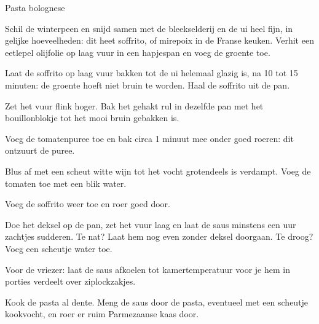 \begin{recipe}{Pasta bolognese}
\begin{steps}
  \item Schil de winterpeen en snijd samen met de bleekselderij en de ui
        heel fijn, in gelijke hoeveelheden: dit heet soffrito, of mirepoix
        in de Franse keuken. Verhit een eetlepel olijfolie op laag vuur in
        een hapjespan en voeg de groente toe.
  \item Laat de soffrito op laag vuur bakken tot de ui helemaal glazig is,
        na 10 tot 15 minuten: de groente hoeft niet bruin te worden. Haal de
        soffrito uit de pan.
  \item Zet het vuur flink hoger. Bak het gehakt rul in dezelfde pan met het
        bouillonblokje tot het mooi bruin gebakken is.
  \item Voeg de tomatenpuree toe en bak circa 1 minuut mee onder goed
        roeren: dit ontzuurt de puree.
  \item Blus af met een scheut witte wijn tot het vocht grotendeels is
        verdampt. Voeg de tomaten toe met een blik water.
  \item Voeg de soffrito weer toe en roer goed door.
  \item Doe het deksel op de pan, zet het vuur laag en laat de saus minstens
        een uur zachtjes sudderen. Te nat? Laat hem nog even zonder deksel
        doorgaan. Te droog? Voeg een scheutje water toe.
  \item Voor de vriezer: laat de saus afkoelen tot kamertemperatuur voor je
        hem in porties verdeelt over ziplockzakjes.
  \item Kook de pasta al dente. Meng de saus door de pasta, eventueel met een
        scheutje kookvocht, en roer er ruim Parmezaanse kaas door.
\end{steps}
\end{recipe}
